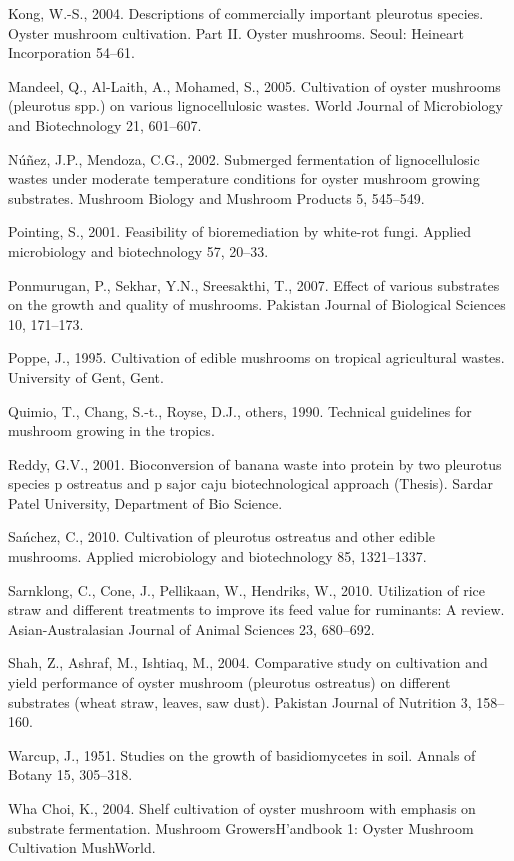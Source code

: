 \documentclass[]{elsarticle} %
\begin{document}
\leavevmode\hypertarget{ref-kong2004}{}%
Kong, W.-S., 2004. Descriptions of commercially important pleurotus
species. Oyster mushroom cultivation. Part II. Oyster mushrooms. Seoul:
Heineart Incorporation 54--61.

\leavevmode\hypertarget{ref-mandeel2005cultivation}{}%
Mandeel, Q., Al-Laith, A., Mohamed, S., 2005. Cultivation of oyster
mushrooms (pleurotus spp.) on various lignocellulosic wastes. World
Journal of Microbiology and Biotechnology 21, 601--607.

\leavevmode\hypertarget{ref-nunez2002submerged}{}%
Núñez, J.P., Mendoza, C.G., 2002. Submerged fermentation of
lignocellulosic wastes under moderate temperature conditions for oyster
mushroom growing substrates. Mushroom Biology and Mushroom Products 5,
545--549.

\leavevmode\hypertarget{ref-pointing2001}{}%
Pointing, S., 2001. Feasibility of bioremediation by white-rot fungi.
Applied microbiology and biotechnology 57, 20--33.

\leavevmode\hypertarget{ref-ponmurugan2007effect}{}%
Ponmurugan, P., Sekhar, Y.N., Sreesakthi, T., 2007. Effect of various
substrates on the growth and quality of mushrooms. Pakistan Journal of
Biological Sciences 10, 171--173.

\leavevmode\hypertarget{ref-poppe1995}{}%
Poppe, J., 1995. Cultivation of edible mushrooms on tropical
agricultural wastes. University of Gent, Gent.

\leavevmode\hypertarget{ref-quimio1990technical}{}%
Quimio, T., Chang, S.-t., Royse, D.J., others, 1990. Technical
guidelines for mushroom growing in the tropics.

\leavevmode\hypertarget{ref-reddy2001bioconversion}{}%
Reddy, G.V., 2001. Bioconversion of banana waste into protein by two
pleurotus species p ostreatus and p sajor caju biotechnological approach
(Thesis). Sardar Patel University, Department of Bio Science.

\leavevmode\hypertarget{ref-sanchez2010cultivation}{}%
Sańchez, C., 2010. Cultivation of pleurotus ostreatus and other edible
mushrooms. Applied microbiology and biotechnology 85, 1321--1337.

\leavevmode\hypertarget{ref-sarnklong2010utilization}{}%
Sarnklong, C., Cone, J., Pellikaan, W., Hendriks, W., 2010. Utilization
of rice straw and different treatments to improve its feed value for
ruminants: A review. Asian-Australasian Journal of Animal Sciences 23,
680--692.

\leavevmode\hypertarget{ref-shah2004comparative}{}%
Shah, Z., Ashraf, M., Ishtiaq, M., 2004. Comparative study on
cultivation and yield performance of oyster mushroom (pleurotus
ostreatus) on different substrates (wheat straw, leaves, saw dust).
Pakistan Journal of Nutrition 3, 158--160.

\leavevmode\hypertarget{ref-warcup1951studies}{}%
Warcup, J., 1951. Studies on the growth of basidiomycetes in soil.
Annals of Botany 15, 305--318.

\leavevmode\hypertarget{ref-kyung2004shelfcultivation}{}%
Wha Choi, K., 2004. Shelf cultivation of oyster mushroom with emphasis
on substrate fermentation. Mushroom GrowersH'andbook 1: Oyster Mushroom
Cultivation MushWorld.
\end{document}
